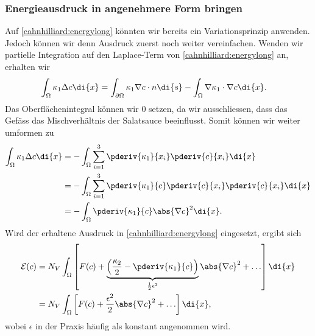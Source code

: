 \subsubsection{Energieausdruck in angenehmere Form bringen}
Auf \eqref{cahnhilliard:energylong} könnten wir bereits ein Variationsprinzip anwenden.
Jedoch können wir denn Ausdruck zuerst noch weiter vereinfachen.
Wenden wir partielle Integration auf den Laplace-Term von \eqref{cahnhilliard:energylong} an,
erhalten wir
\begin{align*}
\int_\Omega \kappa_1 \Delta c \di{x}
&=
\int_{\partial\Omega} \kappa_1 \nabla c \cdot n \di{s}
- \int_\Omega \nabla \kappa_1 \cdot \nabla c \di{x}
.
\end{align*}
Das Oberflächenintegral können wir $0$ setzen,
da wir ausschliessen,
dass das Gefäss das Mischverhältnis der Salatsauce beeinflusst.
Somit können wir weiter umformen zu
\begin{align*}
\int_\Omega \kappa_1 \Delta c \di{x}
&=-\int_\Omega \sum_{i=1}^3 \pderiv{\kappa_1}{x_i} \pderiv{c}{x_i} \di{x}
\\
&=-\int_\Omega \sum_{i=1}^3 \pderiv{\kappa_1}{c} \pderiv{c}{x_i} \pderiv{c}{x_i} \di{x}
\\
&=
-\int_\Omega \pderiv{\kappa_1}{c} \abs{\nabla c}^2 \di{x}
.
\end{align*}
Wird der erhaltene Ausdruck in \eqref{cahnhilliard:energylong} eingesetzt,
ergibt sich
\begin{align}
\mathcal{E}(c)
&=
N_V \int_\Omega \left[
  F(c) + \underbrace{\left( \frac{\kappa_2}{2} - \pderiv{\kappa_1}{c} \right)}_{\frac{1}{2}\epsilon^2} \abs{\nabla c}^2  + \ldots
\right]\di{x}
\nonumber
\\
&=
N_V \int_\Omega \left[
  F(c) + \frac{\epsilon^2}{2} \abs{\nabla c}^2  + \ldots
\right]\di{x}
,
\label{cahnhilliard:energy}
\end{align}
wobei $\epsilon$ in der Praxis häufig als konstant angenommen wird.
